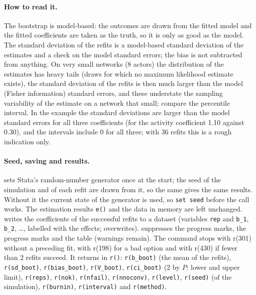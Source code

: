 \paragraph{How to read it.} The bootstrap is model-based: the outcomes are drawn from the fitted model and the fitted coefficients are taken as the truth, so it is only as good as the model. The standard deviation of the refits is a model-based standard deviation of the estimates and a check on the model standard errors; the bias is not subtracted from anything. On very small networks (8 actors) the distribution of the estimates has heavy tails (draws for which no maximum likelihood estimate exists), the standard deviation of the refits is then much larger than the model (Fisher information) standard errors, and these understate the sampling variability of the estimate on a network that small; compare the percentile interval. In the example the standard deviations are larger than the model standard errors for all three coefficients (for the activity coefficient 1.10 against 0.30), and the intervals include 0 for all three; with 36 refits this is a rough indication only.

\paragraph{Seed, saving and results.}  sets Stata's random-number generator once at the start; the seed of the simulation and of each refit are drawn from it, so the same  gives the same results. Without it the current state of the generator is used, so \texttt{set seed} before the call works. The estimation results \texttt{e()} and the data in memory are left unchanged.  writes the coefficients of the successful refits to a dataset (variables \texttt{rep} and \texttt{b\_1}, \texttt{b\_2}, \dots, labelled with the effects;  overwrites).  suppresses the progress marks,  the progress marks and the table (warnings remain). The command stops with r(301) without a preceding fit, with r(198) for a bad option and with r(430) if fewer than 2 refits succeed. It returns in \texttt{r()}: \texttt{r(b\_boot)} (the mean of the refits), \texttt{r(sd\_boot)}, \texttt{r(bias\_boot)}, \texttt{r(V\_boot)}, \texttt{r(ci\_boot)} (2 by $P$: lower and upper limit), \texttt{r(reps)}, \texttt{r(nok)}, \texttt{r(nfail)}, \texttt{r(nnoconv)}, \texttt{r(level)}, \texttt{r(seed)} (of the simulation), \texttt{r(burnin)}, \texttt{r(interval)} and \texttt{r(method)}.

